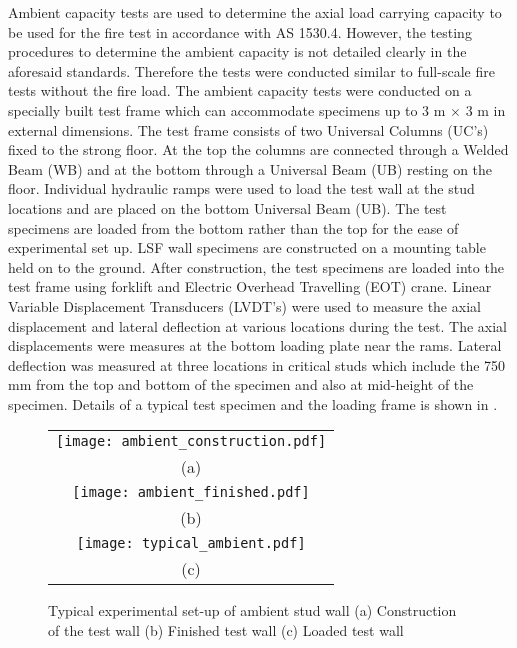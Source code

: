 Ambient capacity tests are used to determine the axial load carrying capacity to be used for the fire test in accordance with AS 1530.4. However, the testing procedures to determine the ambient capacity is not detailed clearly in the aforesaid standards. Therefore the tests were conducted similar to full-scale fire tests without the fire load. The ambient capacity tests were conducted on a specially built test frame which can accommodate specimens up to 3 m \(\times\) 3 m in external dimensions. The test frame consists of two Universal Columns (UC's) fixed to the strong floor. At the top the columns are connected through a Welded Beam (WB) and at the bottom through a Universal Beam (UB) resting on the floor. Individual hydraulic ramps were used to load the test wall at the stud locations and are placed on the bottom Universal Beam (UB). The test specimens are loaded from the bottom rather than the top for the ease of experimental set up. LSF wall specimens are constructed on a mounting table held on to the ground. After construction, the test specimens are loaded into the test frame using forklift and Electric Overhead Travelling (EOT) crane. Linear Variable Displacement Transducers (LVDT's) were used to measure the axial displacement and lateral deflection at various locations during the test. The axial displacements were measures at the bottom loading plate near the rams. Lateral deflection was measured at three locations in critical studs which include the 750 mm from the top and bottom of the specimen and also at mid-height of the specimen. Details of a typical test specimen and the loading frame is shown in .
\begin{figure}[!htbp]
	\centering
		\begin{tabular}{c}
			\texttt{[image: ambient\_construction.pdf]} \\
			(a) \\
			\texttt{[image: ambient\_finished.pdf]} \\ 
			(b)  \\
			\texttt{[image: typical\_ambient.pdf]}\\
			(c)  \\ 
		\end{tabular} 
		\caption{Typical experimental set-up of ambient stud wall (a) Construction of the test wall (b) Finished test wall (c) Loaded test wall}
		\label{fig:typical-ambient}
\end{figure}

